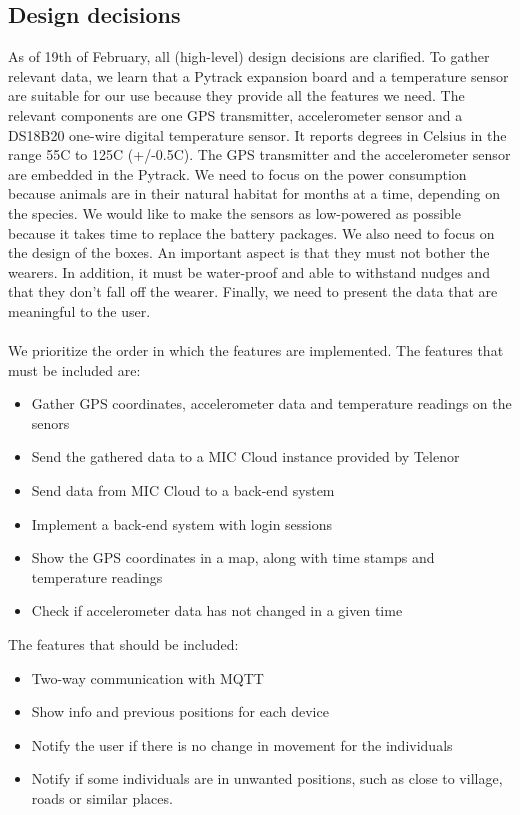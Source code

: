 \subsection{Design decisions}
	As of 19th of February, all (high-level) design decisions are clarified. To gather relevant data, we learn that a Pytrack expansion board and a temperature sensor are suitable for our use because they provide all the features we need. The relevant components are one GPS transmitter, accelerometer sensor and a DS18B20 one-wire digital temperature sensor. It reports degrees in Celsius in the range 55C to 125C (+/-0.5C). The GPS transmitter and the accelerometer sensor are embedded in the Pytrack. We need to focus on the power consumption because animals are in their natural habitat for months at a time, depending on the species. We would like to make the sensors as low-powered as possible because it takes time to replace the battery packages. We also need to focus on the design of the boxes. An important aspect is that they must not bother the wearers. In addition, it must be water-proof and able to withstand nudges and that they don't fall off the wearer. Finally, we need to present the data that are meaningful to the user.
	\\\\
	We prioritize the order in which the features are implemented. The features that must be included are:
	\begin{itemize}  
		\item Gather GPS coordinates, accelerometer data and temperature readings on the senors
		\item Send the gathered data to a MIC Cloud instance provided by Telenor
		\item Send data from MIC Cloud to a back-end system
		\item Implement a back-end system with login sessions 		
		\item Show the GPS coordinates in a map, along with time stamps and temperature readings
		\item Check if accelerometer data has not changed in a given time
	\end{itemize}
	The features that should be included:
	\begin{itemize}  
		\item Two-way communication with MQTT
		\item Show info and previous positions for each device
		\item Notify the user if there is no change in movement for the individuals
		\item Notify if some individuals are in unwanted positions, such as close to village, roads or similar places.
	\end{itemize}
